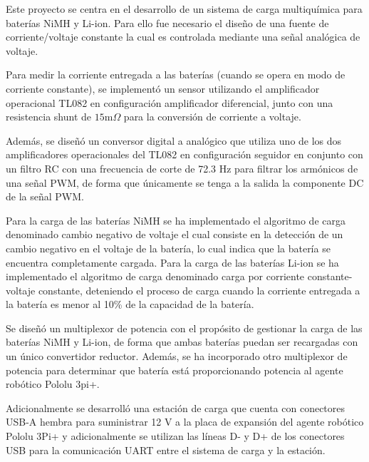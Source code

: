 Este proyecto se centra en el desarrollo de un sistema de carga multiquímica para baterías NiMH y Li-ion.
Para ello fue necesario el diseño de  una fuente de corriente/voltaje constante 
la cual es  controlada mediante una señal analógica de voltaje.

Para medir la corriente entregada a las baterías (cuando se opera en modo de
corriente constante), se implementó un sensor utilizando el amplificador
operacional TL082 en configuración amplificador diferencial, 
junto con una resistencia shunt de $15 \text{m}\Omega$ para la conversión de corriente a
voltaje.

Además, se diseñó un conversor digital a analógico que utiliza
uno de los dos amplificadores operacionales del TL082 en configuración seguidor
en conjunto con un filtro RC con una frecuencia de corte de 72.3 Hz para filtrar
los armónicos de una señal PWM, de forma que únicamente se tenga a la salida la
componente DC de la señal PWM.

Para la carga de las baterías NiMH se ha implementado el algoritmo de carga 
denominado cambio negativo de voltaje el cual consiste en la detección de un
cambio negativo en el voltaje de la batería, lo cual indica que la batería 
se encuentra completamente cargada. Para la carga de las baterías 
Li-ion se ha implementado el algoritmo de carga
denominado carga por corriente constante-voltaje constante, deteniendo el proceso
de carga cuando la corriente entregada a la batería es menor al 10\% de la capacidad
de la batería.


Se diseñó un multiplexor de potencia con el propósito de gestionar
la carga de las baterías NiMH y
Li-ion, de forma que ambas baterías puedan ser recargadas con un único convertidor
reductor. Además, se ha incorporado otro multiplexor 
de potencia para determinar que batería está proporcionando potencia al 
agente robótico Pololu 3pi+.
 
Adicionalmente se desarrolló una estación de carga que cuenta con conectores USB-A
hembra para suministrar 12 V a la placa de expansión del agente robótico Pololu 3Pi+
y adicionalmente se utilizan las líneas D- y D+ de los conectores USB para la
comunicación UART entre el sistema de carga y la estación.


